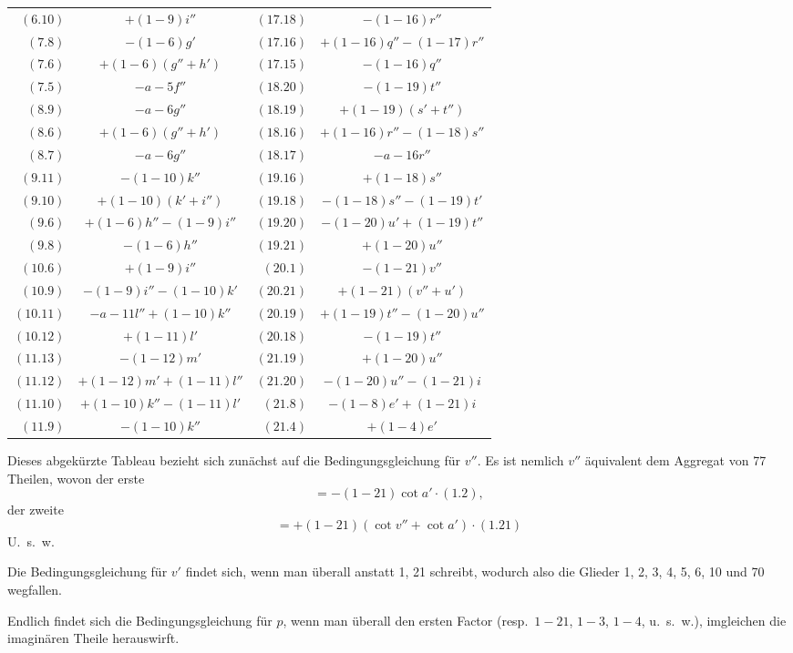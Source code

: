 \documentclass[12pt,a4paper]{article}
\theoremstyle{plain}
\theoremstyle{definition}
\theoremstyle{remark}
\begin{document}
\begin{center}
\begin{tabular}{r|c||r|c}
$(6.10)$ & $+(1-9)i''$ & $(17.18)$ & $-(1-16)r''$\\
$(7.8)$ & $-(1-6)g'$ & $(17.16)$ & $+(1-16)q'' - (1-17)r''$\\
$(7.6)$ & $+(1-6)(g'' + h')$ & $(17.15)$ & $-(1-16)q''$\\
$(7.5)$ & $-a - 5f''$ & $(18.20)$ & $-(1-19)t''$\\
$(8.9)$ & $-a - 6g''$ & $(18.19)$ & $+(1-19)(s' + t'')$\\
$(8.6)$ & $+(1-6)(g'' + h')$ & $(18.16)$ & $+(1-16)r'' - (1-18)s''$\\
$(8.7)$ & $-a - 6g''$ & $(18.17)$ & $-a - 16r''$\\
$(9.11)$ & $-(1-10)k''$ & $(19.16)$ & $+(1-18)s''$\\
$(9.10)$ & $+(1-10)(k' + i'')$ & $(19.18)$ & $-(1-18)s'' - (1-19)t'$\\
$(9.6)$ & $+(1-6)h'' - (1-9)i''$ & $(19.20)$ & $-(1-20)u' + (1-19)t''$\\
$(9.8)$ & $-(1-6)h''$ & $(19.21)$ & $+(1-20)u''$\\
$(10.6)$ & $+(1-9)i''$ & $(20.1)$ & $-(1-21)v''$\\
$(10.9)$ & $-(1-9)i'' - (1-10)k'$ & $(20.21)$ & $+(1-21)(v'' + u')$\\
$(10.11)$ & $-a - 11l'' + (1-10)k''$ & $(20.19)$ & $+(1-19)t'' - (1-20)u''$\\
$(10.12)$ & $+(1-11)l'$ & $(20.18)$ & $-(1-19)t''$\\
$(11.13)$ & $-(1-12)m'$ & $(21.19)$ & $+(1-20)u''$\\
$(11.12)$ & $+(1-12)m' + (1-11)l''$ & $(21.20)$ & $-(1-20)u'' - (1-21)i$\\
$(11.10)$ & $+(1-10)k'' - (1-11)l'$ & $(21.8)$ & $-(1-8)e' + (1-21)i$\\
$(11.9)$ & $-(1-10)k''$ & $(21.4)$ & $+(1-4)e'$
\end{tabular}
\end{center}

\medskip
Dieses abgek\"urzte Tableau bezieht sich zun\"achst auf die Bedingungsgleichung f\"ur $v''$. Es ist nemlich $v''$ \"aquivalent dem Aggregat von 77 Theilen, wovon der erste
\[= -(1-21)\cot a' \cdot (1.2),\]
der zweite
\[= +(1-21)(\cot v'' + \cot a') \cdot (1.21)\]
U.\ s.\ w.

Die Bedingungsgleichung f\"ur $v'$ findet sich, wenn man \"uberall anstatt 1, 21 schreibt, wodurch also die Glieder 1, 2, 3, 4, 5, 6, 10 und 70 wegfallen.

Endlich findet sich die Bedingungsgleichung f\"ur $p$, wenn man \"uberall den ersten Factor (resp.\ $1-21$, $1-3$, $1-4$, u.\ s.\ w.), imgleichen die imagin\"aren Theile herauswirft.
\end{document}
